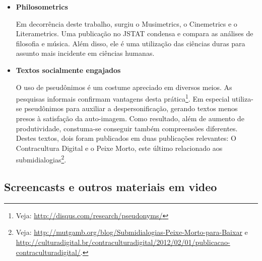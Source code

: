 \begin{itemize}
    \item {\bf Philosometrics}

Em decorrência deste trabalho, surgiu o  Musimetrics,
o Cinemetrics e o Literametrics. Uma publicação no
JSTAT condensa e compara as análises de filosofia
e música.\cite{FabbriJSTAT}
Além disso, ele é uma
utilização das ciências duras para 
assunto mais incidente em ciências humanas. 

    \item {\bf Textos socialmente engajados }

O uso de pseudônimos é um costume apreciado em diversos meios. As pesquisas informais confirmam vantagens desta prática\footnote{Veja: \url{http://disqus.com/research/pseudonyms/}}.
Em especial utiliza-se pseudônimos para
auxiliar a despersonificação, gerando textos menos presos à satisfação da auto-imagem. Como resultado, além de aumento de produtividade, constuma-se conseguir também compreensões diferentes. Destes textos, dois foram publicados em duas publicações relevantes: O Contracultura Digital e o Peixe Morto, este último relacionado aos submidialogias\footnote{Veja: \url{http://mutgamb.org/blog/Submidialogias-Peixe-Morto-para-Baixar} e \url{http://culturadigital.br/contraculturadigital/2012/02/01/publicacao-contraculturadigital/}.}.

 \end{itemize}

\subsection{Screencasts e outros materiais em video}

